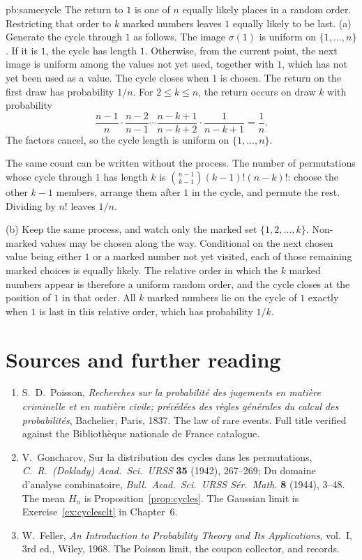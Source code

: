 \begin{solution}{pb:samecycle}
\idea The return to $1$ is one of $n$ equally likely places in a random order. Restricting that order to $k$ marked numbers leaves $1$ equally likely to be last.
\writeup (a) Generate the cycle through $1$ as follows. The image $\sigma(1)$ is uniform on $\{1,\ldots,n\}$. If it is $1$, the cycle has length $1$. Otherwise, from the current point, the next image is uniform among the values not yet used, together with $1$, which has not yet been used as a value. The cycle closes when $1$ is chosen. The return on the first draw has probability $1/n$. For $2\le k\le n$, the return occurs on draw $k$ with probability
\[
 \frac{n-1}n\cdot\frac{n-2}{n-1}\cdots\frac{n-k+1}{n-k+2}\cdot\frac1{n-k+1}=\frac1n.
\]
The factors cancel, so the cycle length is uniform on $\{1,\ldots,n\}$.

The same count can be written without the process. The number of permutations whose cycle through $1$ has length $k$ is $\binom{n-1}{k-1}(k-1)!(n-k)!$: choose the other $k-1$ members, arrange them after $1$ in the cycle, and permute the rest. Dividing by $n!$ leaves $1/n$.

(b) Keep the same process, and watch only the marked set $\{1,2,\ldots,k\}$. Non-marked values may be chosen along the way. Conditional on the next chosen value being either $1$ or a marked number not yet visited, each of those remaining marked choices is equally likely. The relative order in which the $k$ marked numbers appear is therefore a uniform random order, and the cycle closes at the position of $1$ in that order. All $k$ marked numbers lie on the cycle of $1$ exactly when $1$ is last in this relative order, which has probability $1/k$.
\end{solution}

\section*{Sources and further reading}

\begin{enumerate}
\item S.~D.~Poisson, \emph{Recherches sur la probabilit\'e des jugements en mati\`ere criminelle et en mati\`ere civile; pr\'ec\'ed\'ees des r\`egles g\'en\'erales du calcul des probabilit\'es}, Bachelier, Paris, 1837. The law of rare events. Full title verified against the Biblioth\`eque nationale de France catalogue.
\item V.~Goncharov, Sur la distribution des cycles dans les permutations, \emph{C.\ R.\ (Doklady) Acad.\ Sci.\ URSS} \textbf{35} (1942), 267--269; Du domaine d'analyse combinatoire, \emph{Bull.\ Acad.\ Sci.\ URSS S\'er.\ Math.} \textbf{8} (1944), 3--48. The mean $H_n$ is Proposition~\ref{prop:cycles}. The Gaussian limit is Exercise~\ref{ex:cyclesclt} in Chapter~6.
\item W.~Feller, \emph{An Introduction to Probability Theory and Its Applications}, vol.~I, 3rd ed., Wiley, 1968. The Poisson limit, the coupon collector, and records.
\end{enumerate}

